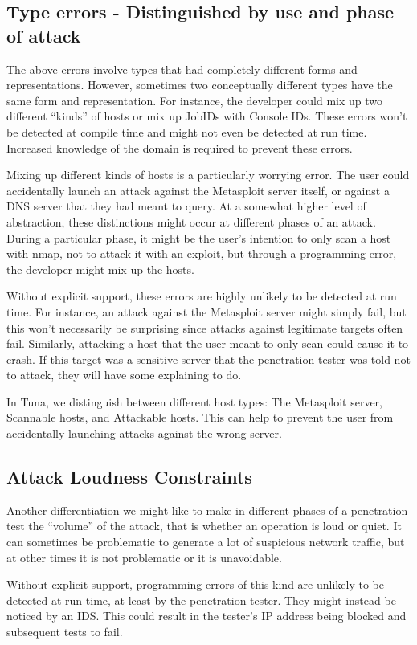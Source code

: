 \documentclass[figure,letterpaper,onefignum]{mysiam}
\begin{document}
\subsection{Type errors - Distinguished by use and phase of attack}
The above errors involve types that had completely different forms and representations. However, sometimes two conceptually different types have the same form and representation. For instance, the developer could mix up two different ``kinds'' of hosts or mix up JobIDs with Console IDs. These errors won't be detected at compile time and might not even be detected at run time. Increased knowledge of the domain is required to prevent these errors.

Mixing up different kinds of hosts is a particularly worrying error. The user could accidentally launch an attack against the Metasploit server itself, or against a DNS server that they had meant to query. At a somewhat higher level of abstraction, these distinctions might occur at different phases of an attack. During a particular phase, it might be the user's intention to only scan a host with nmap, not to attack it with an exploit, but through a programming error, the developer might mix up the hosts.

Without explicit support, these errors are highly unlikely to be detected at run time. For instance, an attack against the Metasploit server might simply fail, but this won't necessarily be surprising since attacks against legitimate targets often fail. Similarly, attacking a host that the user meant to only scan could cause it to crash. If this target was a sensitive server that the penetration tester was told not to attack, they will have some explaining to do.

In Tuna, we distinguish between different host types: The Metasploit server, Scannable hosts, and Attackable hosts. This can help to prevent the user from accidentally launching attacks against the wrong server.

\subsection{Attack Loudness Constraints}
Another differentiation we might like to make in different phases of a penetration test the ``volume'' of the attack, that is whether an operation is loud or quiet. It can sometimes be problematic to generate a lot of suspicious network traffic, but at other times it is not problematic or it is unavoidable.

Without explicit support, programming errors of this kind are unlikely to be detected at run time, at least by the penetration tester. They might instead be noticed by an IDS. This could result in the tester's IP address being blocked and subsequent tests to fail.
\end{document}

